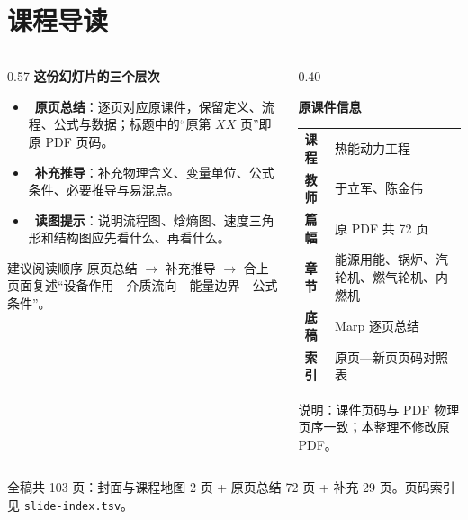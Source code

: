 \section{课程导读}
\begin{frame}[t,shrink]{}
\begin{columns}[T,onlytextwidth]
\begin{column}{0.57\textwidth}
  {\small\bfseries 这份幻灯片的三个层次}\par\vspace{1.2mm}
  \begin{itemize}
    \item \srctag\ \textbf{原页总结}：逐页对应原课件，保留定义、流程、公式与数据；标题中的“原第 \(XX\) 页”即原 PDF 页码。
    \item \addtag\ \textbf{补充推导}：补充物理含义、变量单位、公式条件、必要推导与易混点。
    \item \readtag\ \textbf{读图提示}：说明流程图、焓熵图、速度三角形和结构图应先看什么、再看什么。
  \end{itemize}
  \vspace{1.0mm}
  \begin{keybox}{建议阅读顺序}
  \small 原页总结 $\rightarrow$ 补充推导 $\rightarrow$ 合上页面复述“设备作用—介质流向—能量边界—公式条件”。
  \end{keybox}
\end{column}
\begin{column}{0.40\textwidth}
  \begin{plainbox}
  {\small\bfseries 原课件信息}\par\vspace{1.2mm}
  \begin{tabularx}{\linewidth}{@{}>{\bfseries}p{15mm}X@{}}
    课程 & 热能动力工程\\[0.8mm]
    教师 & 于立军、陈金伟\\[0.8mm]
    篇幅 & 原 PDF 共 72 页\\[0.8mm]
    章节 & 能源用能、锅炉、汽轮机、燃气轮机、内燃机\\[0.8mm]
    底稿 & Marp 逐页总结\\[0.8mm]
    索引 & 原页—新页页码对照表
  \end{tabularx}
  \end{plainbox}
  \vspace{1.0mm}
  {\fontsize{7.2}{9}\selectfont\textcolor{black!58}{说明：课件页码与 PDF 物理页序一致；本整理不修改原 PDF。}}
\end{column}
\end{columns}
\vspace{1mm}
\begin{plainbox}
\small 全稿共 103 页：封面与课程地图 2 页 + 原页总结 72 页 + 补充 29 页。页码索引见 \texttt{slide-index.tsv}。
\end{plainbox}
\end{frame}

